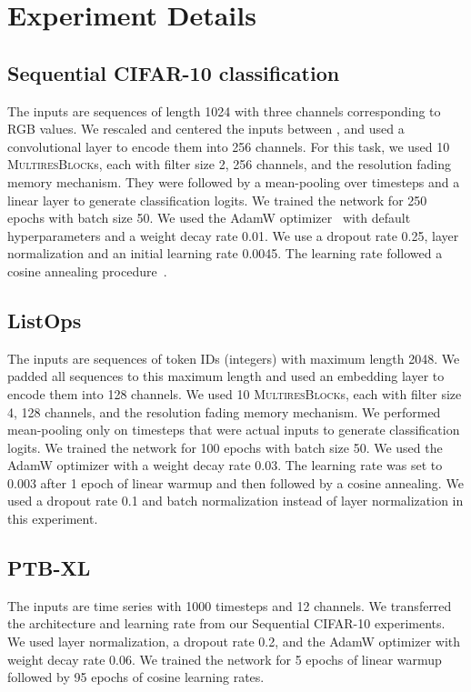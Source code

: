 \documentclass{article}
\theoremstyle{plain}
\theoremstyle{definition}
\theoremstyle{remark}
\newcommand{\ourblock}{\textsc{MultiresBlock}}
\begin{document}
\section{Experiment Details}
\label{app:exp-details}

\subsection{Sequential CIFAR-10 classification}

The inputs are sequences of length 1024 with three channels corresponding to RGB values. 
We rescaled and centered the inputs between , and used a  convolutional layer to encode them into 256 channels.
For this task, we used 10 \ourblock s, 
each with filter size 2, 256 channels, and the resolution fading memory mechanism. 
They were followed by a mean-pooling over timesteps and a linear layer to generate classification logits. 
We trained the network for 250 epochs with batch size 50.
We used the AdamW optimizer~\citep{loshchilov2018decoupled} with default hyperparameters and a weight decay rate 0.01. 
We use a dropout rate 0.25, layer normalization and an initial learning rate 0.0045. 
The learning rate followed a cosine annealing procedure~\citep{loshchilov2017sgdr}. 


\subsection{ListOps}

The inputs are sequences of token IDs (integers) with maximum length 2048. 
We padded all sequences to this maximum length and used an embedding layer to encode them into 128 channels. 
We used 10 \ourblock s, each with filter size 4, 128 channels, and the resolution fading memory mechanism. 
We performed mean-pooling only on timesteps that were actual inputs to generate classification logits. 
We trained the network for 100 epochs with batch size 50. 
We used the AdamW optimizer with a weight decay rate 0.03. 
The learning rate was set to 0.003 after 1 epoch of linear warmup and then followed by a cosine annealing. 
We used a dropout rate 0.1 and batch normalization instead of layer normalization in this experiment. 

\subsection{PTB-XL}

The inputs are time series with 1000 timesteps and 12 channels. 
We transferred the architecture and learning rate from our Sequential CIFAR-10 experiments. 
We used layer normalization, a dropout rate 0.2, and the AdamW optimizer with weight decay rate 0.06. 
We trained the network for 5 epochs of linear warmup followed by 95 epochs of cosine learning rates.
\end{document}
